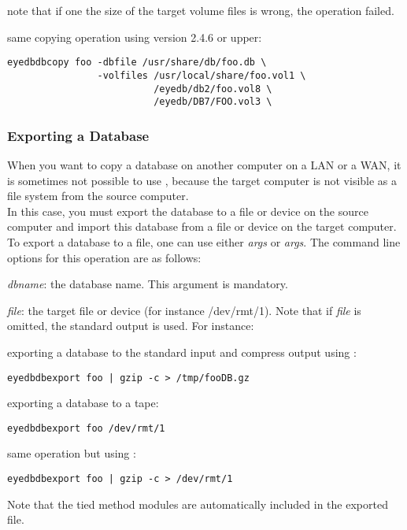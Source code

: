 \normalsize
note that if one the size of the target volume files is wrong, the
operation failed.
\item same copying operation using version 2.4.6 or upper:
\verbsize
\begin{verbatim}
eyedbdbcopy foo -dbfile /usr/share/db/foo.db \
                -volfiles /usr/local/share/foo.vol1 \
                          /eyedb/db2/foo.vol8 \
                          /eyedb/DB7/FOO.vol3 \
\end{verbatim}
\normalsize
\ei

\subsubsection{Exporting a Database}
When you want to copy a database on another computer on a LAN or a WAN,
it is sometimes not possible to use , because the
target computer is not visible as a file system from the source
computer.
\\
In this case, you must export the database to a file or device on the
source computer and import this database from a file or device
on the target computer.
\\
To export a database to a file, one can use either  \emph{args}
or \ttv{eyedbdbexport} \emph{args}.
The command line options for this operation are as follows:
\bi
\item \emph{dbname}: the database name. This argument is mandatory.
\item \emph{file}: the target file or device (for instance /dev/rmt/1). Note
that if \emph{file} is omitted, the standard output is used.
\ei
For instance:
\bi
\item exporting a database to the standard input and compress output
using :
\verbsize
\begin{verbatim}
eyedbdbexport foo | gzip -c > /tmp/fooDB.gz
\end{verbatim}
\normalsize
\item exporting a database to a tape:
\verbsize
\begin{verbatim}
eyedbdbexport foo /dev/rmt/1
\end{verbatim}
\normalsize
\item same operation but using :
\verbsize
\begin{verbatim}
eyedbdbexport foo | gzip -c > /dev/rmt/1
\end{verbatim}
\normalsize
\ei
Note that the tied method modules are automatically included in the
exported file.
